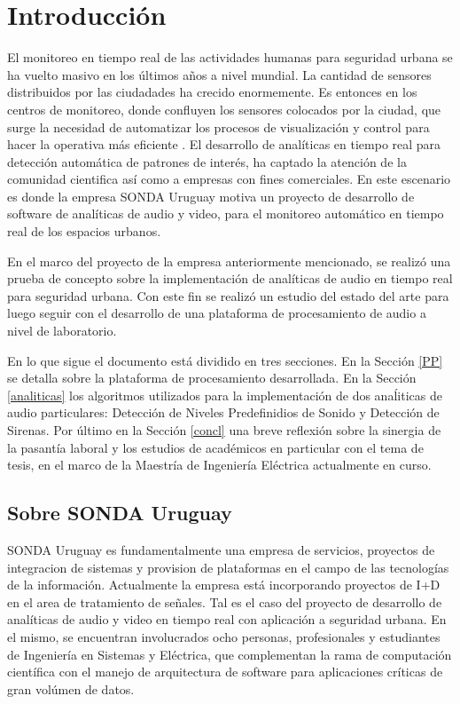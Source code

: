 \documentclass{article}
\begin{document}
\section{Introducción}
El monitoreo en tiempo real de las actividades humanas para seguridad urbana se ha vuelto masivo en los últimos años a nivel mundial. La cantidad de sensores distribuidos por las ciudadades ha crecido enormemente. Es entonces en los centros de monitoreo, donde confluyen los sensores colocados por la ciudad, que surge la necesidad de automatizar los procesos de visualización y control para hacer la operativa más eficiente \citep{Crocco:2016:ASS:2891449.2871183}. El desarrollo de analíticas en tiempo real para detección automática de patrones de interés, ha captado la atención de la comunidad cientifica así como a empresas con fines comerciales. En este escenario es donde la empresa SONDA Uruguay motiva un proyecto de desarrollo de software de analíticas de audio y video, para el monitoreo automático en tiempo real de los espacios urbanos.  

\smallskip
En el marco del proyecto de la empresa anteriormente mencionado, se realizó una prueba de concepto sobre la implementación de analíticas de audio en tiempo real para seguridad urbana. Con este fin se realizó un estudio del estado del arte para luego seguir con el desarrollo de una plataforma de procesamiento de audio a nivel de laboratorio. 

\smallskip
En lo que sigue el documento está dividido en tres secciones. En la Sección \ref{PP} se detalla sobre la plataforma de procesamiento desarrollada. En la Sección \ref{analiticas} los algoritmos utilizados para la implementación de dos anaĺiticas de audio particulares: Detección de Niveles Predefinidios de Sonido y Detección de Sirenas. Por último en la Sección \ref{concl} una breve reflexión sobre la sinergia de la pasantía laboral y los estudios de académicos en particular con el tema de tesis, en el marco de la Maestría de Ingeniería Eléctrica actualmente en curso.  

\subsection{Sobre SONDA Uruguay}
SONDA Uruguay es fundamentalmente una empresa de servicios, proyectos de integracion de sistemas y provision de plataformas en el campo de las tecnologías de la información. Actualmente la empresa está incorporando proyectos de I+D en el area de tratamiento de señales. Tal es el caso del proyecto de desarrollo de analíticas de audio y video en tiempo real con aplicación a seguridad urbana. En el mismo, se encuentran involucrados ocho personas, profesionales y estudiantes de Ingeniería en Sistemas y Eléctrica, que complementan la rama de computación científica con el manejo de arquitectura de software para aplicaciones críticas de gran volúmen de datos.  
\end{document}
